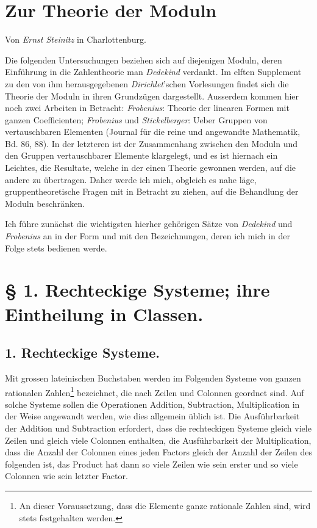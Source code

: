\section*{Zur Theorie der Moduln}
\begin{center}
Von \emph{Ernst Steinitz} in Charlottenburg.
\end{center}

Die folgenden Untersuchungen beziehen sich auf diejenigen Moduln, deren Einführung in die Zahlentheorie man \emph{Dedekind} verdankt. Im elften Supplement zu den von ihm herausgegebenen \emph{Dirichlet}'schen Vorlesungen findet sich die Theorie der Moduln in ihren Grundzügen dargestellt. Ausserdem kommen hier noch zwei Arbeiten in Betracht: \emph{Frobenius}: Theorie der linearen Formen mit ganzen Coefficienten; \emph{Frobenius} und \emph{Stickelberger}: Ueber Gruppen von vertauschbaren Elementen (Journal für die reine und angewandte Mathematik, Bd. 86, 88). In der letzteren ist der Zusammenhang zwischen den Moduln und den Gruppen vertauschbarer Elemente klargelegt, und es ist hiernach ein Leichtes, die Resultate, welche in der einen Theorie gewonnen werden, auf die andere zu übertragen. Daher werde ich mich, obgleich es nahe läge, gruppentheoretische Fragen mit in Betracht zu ziehen, auf die Behandlung der Moduln beschränken.

Ich führe zunächst die wichtigsten hierher gehörigen Sätze von \emph{Dedekind} und \emph{Frobenius} an in der Form und mit den Bezeichnungen, deren ich mich in der Folge stets bedienen werde.

\section*{§ 1. Rechteckige Systeme; ihre Eintheilung in Classen.}

\subsection*{1. Rechteckige Systeme.}

Mit grossen lateinischen Buchstaben werden im Folgenden Systeme von ganzen rationalen Zahlen\footnote{An dieser Voraussetzung, dass die Elemente ganze rationale Zahlen sind, wird stets festgehalten werden.} bezeichnet, die nach Zeilen und Colonnen geordnet sind. Auf solche Systeme sollen die Operationen Addition, Subtraction, Multiplication in der Weise angewandt werden, wie dies allgemein üblich ist. Die Ausführbarkeit der Addition und Subtraction erfordert, dass die rechteckigen Systeme gleich viele Zeilen und gleich viele Colonnen enthalten, die Ausführbarkeit der Multiplication, dass die Anzahl der Colonnen eines jeden Factors gleich der Anzahl der Zeilen des folgenden ist, das Product hat dann so viele Zeilen wie sein erster und so viele Colonnen wie sein letzter Factor.

